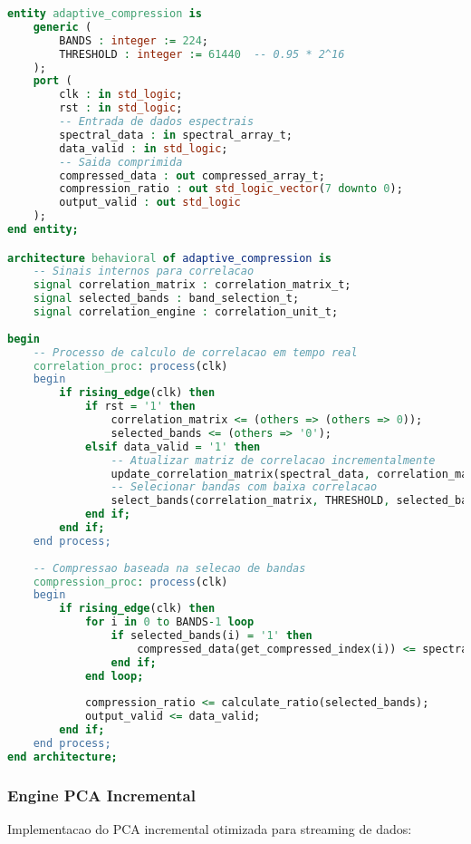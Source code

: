 \begin{lstlisting}[language=VHDL]
entity adaptive_compression is
    generic (
        BANDS : integer := 224;
        THRESHOLD : integer := 61440  -- 0.95 * 2^16
    );
    port (
        clk : in std_logic;
        rst : in std_logic;
        -- Entrada de dados espectrais
        spectral_data : in spectral_array_t;
        data_valid : in std_logic;
        -- Saida comprimida
        compressed_data : out compressed_array_t;
        compression_ratio : out std_logic_vector(7 downto 0);
        output_valid : out std_logic
    );
end entity;

architecture behavioral of adaptive_compression is
    -- Sinais internos para correlacao
    signal correlation_matrix : correlation_matrix_t;
    signal selected_bands : band_selection_t;
    signal correlation_engine : correlation_unit_t;
    
begin
    -- Processo de calculo de correlacao em tempo real
    correlation_proc: process(clk)
    begin
        if rising_edge(clk) then
            if rst = '1' then
                correlation_matrix <= (others => (others => 0));
                selected_bands <= (others => '0');
            elsif data_valid = '1' then
                -- Atualizar matriz de correlacao incrementalmente
                update_correlation_matrix(spectral_data, correlation_matrix);
                -- Selecionar bandas com baixa correlacao
                select_bands(correlation_matrix, THRESHOLD, selected_bands);
            end if;
        end if;
    end process;
    
    -- Compressao baseada na selecao de bandas
    compression_proc: process(clk)
    begin
        if rising_edge(clk) then
            for i in 0 to BANDS-1 loop
                if selected_bands(i) = '1' then
                    compressed_data(get_compressed_index(i)) <= spectral_data(i);
                end if;
            end loop;
            
            compression_ratio <= calculate_ratio(selected_bands);
            output_valid <= data_valid;
        end if;
    end process;
end architecture;
\end{lstlisting}

\subsubsection{Engine PCA Incremental}
Implementacao do PCA incremental otimizada para streaming de dados:

